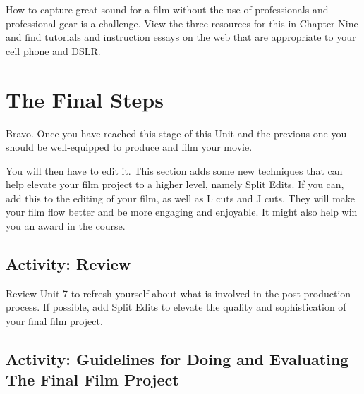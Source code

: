\documentclass[
]{book}
\begin{document}
\begin{reflect}
How to capture great sound for a film without the use of professionals and professional gear is a challenge. View the three resources for this in Chapter Nine and find tutorials and instruction essays on the web that are appropriate to your cell phone and DSLR.
\end{reflect}

\hypertarget{the-final-steps}{%
\section{The Final Steps}\label{the-final-steps}}

Bravo. Once you have reached this stage of this Unit and the previous one you should be well-equipped to produce and film your movie.

You will then have to edit it. This section adds some new techniques that can help elevate your film project to a higher level, namely Split Edits. If you can, add this to the editing of your film, as well as L cuts and J cuts. They will make your film flow better and be more engaging and enjoyable. It might also help win you an award in the course.

\hypertarget{activity-review}{%
\subsection*{Activity: Review}\label{activity-review}}

\begin{reflect}
Review Unit 7 to refresh yourself about what is involved in the post-production process. If possible, add Split Edits to elevate the quality and sophistication of your final film project.
\end{reflect}

\hypertarget{activity-guidelines-for-doing-and-evaluating-the-final-film-project}{%
\subsection*{Activity: Guidelines for Doing and Evaluating The Final Film Project}\label{activity-guidelines-for-doing-and-evaluating-the-final-film-project}}
\end{document}
